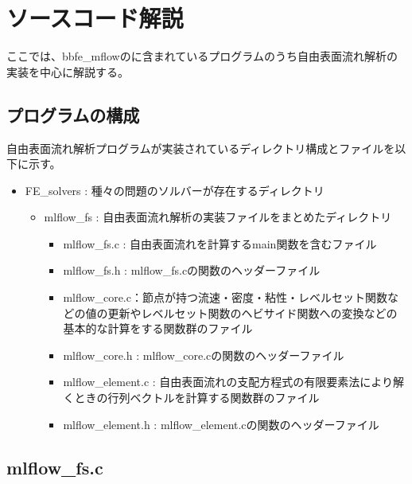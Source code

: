\documentclass[8pt,a4paper]{article}
\begin{document}
\newpage
\section{ソースコード解説}
ここでは、bbfe\_mflowのに含まれているプログラムのうち自由表面流れ解析の実装を中心に解説する。

\subsection{プログラムの構成}
自由表面流れ解析プログラムが実装されているディレクトリ構成とファイルを以下に示す。

\begin{itemize}
	\item FE\_solvers : 種々の問題のソルバーが存在するディレクトリ
  \begin{itemize}
    \item mlflow\_fs : 自由表面流れ解析の実装ファイルをまとめたディレクトリ
    \begin{itemize}
    	\item mlflow\_fs.c : 自由表面流れを計算するmain関数を含むファイル
    	\item mlflow\_fs.h : mlflow\_fs.cの関数のヘッダーファイル
    	\item mlflow\_core.c：節点が持つ流速・密度・粘性・レベルセット関数などの値の更新やレベルセット関数のヘビサイド関数への変換などの基本的な計算をする関数群のファイル
    	\item mlflow\_core.h : mlflow\_core.cの関数のヘッダーファイル
    	\item mlflow\_element.c : 自由表面流れの支配方程式の有限要素法により解くときの行列ベクトルを計算する関数群のファイル
    	\item mlflow\_element.h : mlflow\_element.cの関数のヘッダーファイル
    \end{itemize}
  \end{itemize}
\end{itemize}

\subsection{mlflow\_fs.c}
\end{document}
